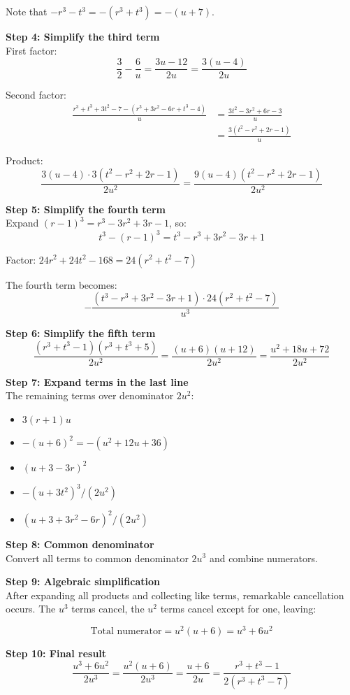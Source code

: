 \documentclass[../../main/main.tex]{subfiles}
\begin{document}
\begin{customproof}
Note that $-r^3 - t^3 = -(r^3 + t^3) = -(u + 7)$.

\textbf{Step 4: Simplify the third term}\\
First factor:
$$\frac{3}{2} - \frac{6}{u} = \frac{3u - 12}{2u} = \frac{3(u - 4)}{2u}$$

Second factor:
\begin{align}
\frac{r^3 + t^3 + 3t^2 - 7 - (r^3 + 3r^2 - 6r + t^3 - 4)}{u} &= \frac{3t^2 - 3r^2 + 6r - 3}{u}\\
&= \frac{3(t^2 - r^2 + 2r - 1)}{u}
\end{align}

Product: 
$$\frac{3(u - 4) \cdot 3(t^2 - r^2 + 2r - 1)}{2u^2} = \frac{9(u - 4)(t^2 - r^2 + 2r - 1)}{2u^2}$$

\textbf{Step 5: Simplify the fourth term}\\
Expand $(r-1)^3 = r^3 - 3r^2 + 3r - 1$, so:
$$t^3 - (r-1)^3 = t^3 - r^3 + 3r^2 - 3r + 1$$

Factor: $24r^2 + 24t^2 - 168 = 24(r^2 + t^2 - 7)$

The fourth term becomes:
$$-\frac{(t^3 - r^3 + 3r^2 - 3r + 1) \cdot 24(r^2 + t^2 - 7)}{u^3}$$

\textbf{Step 6: Simplify the fifth term}
$$\frac{(r^3 + t^3 - 1)(r^3 + t^3 + 5)}{2u^2} = \frac{(u + 6)(u + 12)}{2u^2} = \frac{u^2 + 18u + 72}{2u^2}$$

\textbf{Step 7: Expand terms in the last line}\\
The remaining terms over denominator $2u^2$:
\begin{itemize}
\item $3(r+1)u$ 
\item $-(u + 6)^2 = -(u^2 + 12u + 36)$
\item $(u + 3 - 3r)^2$
\item $-(u + 3t^2)^3/(2u^2)$
\item $(u + 3 + 3r^2 - 6r)^2/(2u^2)$
\end{itemize}

\textbf{Step 8: Common denominator}\\
Convert all terms to common denominator $2u^3$ and combine numerators.

\textbf{Step 9: Algebraic simplification}\\
After expanding all products and collecting like terms, remarkable cancellation occurs. The $u^3$ terms cancel, the $u^2$ terms cancel except for one, leaving:

$$\text{Total numerator} = u^2(u + 6) = u^3 + 6u^2$$

\textbf{Step 10: Final result}
$$\frac{u^3 + 6u^2}{2u^3} = \frac{u^2(u + 6)}{2u^3} = \frac{u + 6}{2u} = \boxed{\frac{r^3 + t^3 - 1}{2(r^3 + t^3 - 7)}}$$
\end{customproof}
\end{document}
